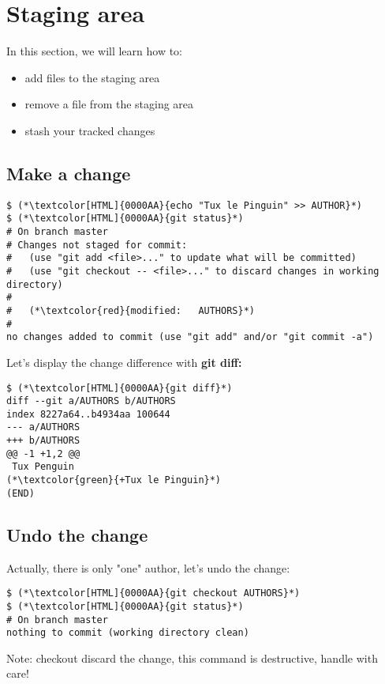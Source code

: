 \section{Staging area}
\begin{frame}[fragile]
  \slidetitle

  In this section, we will learn how to:
  \begin{itemize}
    \item add files to the staging area
    \item remove a file from the staging area
    \item stash your tracked changes
  \end{itemize}
\end{frame}

\subsection{Make a change}
\begin{frame}[fragile]
\subslidetitle
\begin{lstlisting}
$ (*\textcolor[HTML]{0000AA}{echo "Tux le Pinguin" >> AUTHOR}*)
$ (*\textcolor[HTML]{0000AA}{git status}*)
# On branch master
# Changes not staged for commit:
#   (use "git add <file>..." to update what will be committed)
#   (use "git checkout -- <file>..." to discard changes in working directory)
#
#	(*\textcolor{red}{modified:   AUTHORS}*)
#
no changes added to commit (use "git add" and/or "git commit -a")
\end{lstlisting}

Let's display the change difference with \bf{git diff}:

\begin{lstlisting}
$ (*\textcolor[HTML]{0000AA}{git diff}*)
diff --git a/AUTHORS b/AUTHORS
index 8227a64..b4934aa 100644
--- a/AUTHORS
+++ b/AUTHORS
@@ -1 +1,2 @@
 Tux Penguin
(*\textcolor{green}{+Tux le Pinguin}*)
(END)
\end{lstlisting}

\end{frame}

\subsection{Undo the change}
\begin{frame}[fragile]
\subslidetitle

Actually, there is only "one" author, let's undo the change:

\begin{lstlisting}
$ (*\textcolor[HTML]{0000AA}{git checkout AUTHORS}*)
$ (*\textcolor[HTML]{0000AA}{git status}*)
# On branch master
nothing to commit (working directory clean)
\end{lstlisting}

Note: checkout discard the change, this command is destructive, handle with care!

\end{frame}

